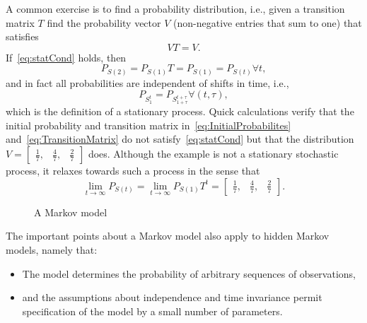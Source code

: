 \documentclass[]{article}
\newcommand{\ts}[3]{#1_{#2}^{#3}}                    %
\newcommand{\ti}[2]{{#1}{(#2)}}                  %
\newcommand{\ie}{i.e.\xspace}
\newcommand{\plotsize}{%
  \fontsize{9}{9}%
  \selectfont}
\renewcommand{\comment}[1]{}
\newcommand*{\inputfig}[2]{}
\newcommand*{\InputIntroductionFig}[1]{\inputfig{../figs/introduction}{#1}}
\begin{document}
A common exercise is to find a \emph{} probability
distribution, \ie, given a transition matrix $T$ find the probability
vector $V$ (non-negative entries that sum to one) that satisfies
\begin{equation}
  \label{eq:statCond}
  VT = V.
\end{equation}
If~\eqref{eq:statCond} holds, then
\begin{equation*}
  P_{\ti{S}{2}}  = P_{\ti{S}{1}}T = P_{\ti{S}{1}} = P_{\ti{S}{t}}
  \forall t,
\end{equation*}
and in fact all probabilities are independent of shifts in time, \ie,
\begin{equation*}
  P_{\ts{S}{1}{t}} = P_{\ts{S}{1+\tau}{t+\tau}} \forall (t,\tau),
\end{equation*}
which is the definition of a stationary process.  Quick calculations
verify that the initial probability and transition matrix
in~\eqref{eq:InitialProbabilites} and~\eqref{eq:TransitionMatrix} do
not satisfy~\eqref{eq:statCond} but that the distribution $V =
\begin{bmatrix} \frac{1}{7}, & \frac{4}{7}, & \frac{2}{7}
\end{bmatrix}$ does.  Although the example is not a stationary
stochastic process, it relaxes towards such a process in the sense
that
\begin{equation*}
  \lim_{t \rightarrow \infty} P_{\ti{S}{t}} =  \lim_{t \rightarrow
    \infty} P_{\ti{S}{1}} T^t = \begin{bmatrix} \frac{1}{7}, & \frac{4}{7}, & \frac{2}{7}
\end{bmatrix}.
\end{equation*}

\begin{figure}[htbp]
  \centering{\plotsize%
    \InputIntroductionFig{Markov_mm}
  }
  \caption[\comment{fig:Markov }A Markov model.]{A Markov model}\label{fig:mm}
\end{figure}

The important points about a Markov model also apply to hidden
Markov models, namely that:
\begin{itemize}
\item The model determines the probability of arbitrary sequences of
  observations,
\item and the assumptions about independence and time invariance
  permit specification of the model by a small number of parameters.
\end{itemize}
\end{document}
